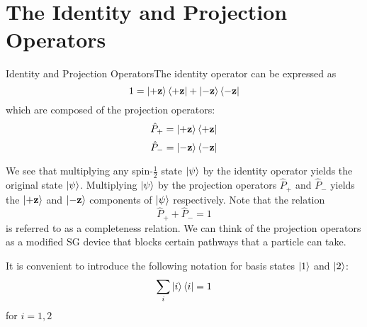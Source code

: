 \documentclass{report}
\newcommand{\dfn}[2]{\begin{Definition}[colbacktitle=red!75!black]{#1}{}#2\end{Definition}}
\begin{document}
\section{The Identity and Projection Operators}
\dfn{Identity and Projection Operators}{The identity operator can be expressed as \[
1 = \ket{+ \mathbf z}\bra{+ \mathbf z} + \ket{- \mathbf z}\bra{- \mathbf z}
\] 
which are composed of the projection operators:
\[
\hat P_+ = \ket{+ \mathbf z}\bra{+ \mathbf z}\]
\[
\hat P _- = \ket{- \mathbf z}\bra{- \mathbf z}
\] 
}
We see that multiplying any spin-\(\frac{1}{2}\) state \(\ket{\psi}\) by the identity operator yields the original state \(\ket{\psi}\). Multiplying \(\ket{\psi}\) by the projection operators \(\hat P_+\) and \(\hat P_-\) yields the \(\ket{+ \mathbf z}\) and \(\ket{- \mathbf z}\) components of \(\ket{\psi}\) respectively. Note that the relation 
\[
\hat P_+ + \hat P_- = 1
\] 
is referred to as a completeness relation. We can think of the projection operators as a modified SG device that blocks certain pathways that a particle can take. 

It is convenient to introduce the following notation for basis states \(\ket{1}\) and \(\ket{2}\):
\[
\sum_i \ket{i}\bra{i} = 1 
\] 
for \(i = 1, 2\)
\end{document}

